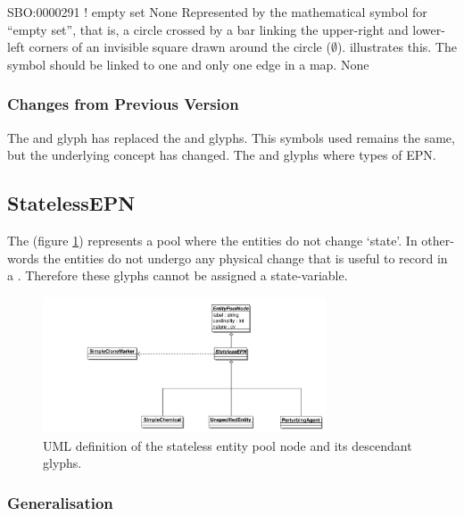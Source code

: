 \begin{glyphDescription}
\glyphSboTerm SBO:0000291 ! empty set
\glyphAux None
\glyphContainer Represented by the mathematical symbol for ``empty
set'', that is, a circle crossed by a bar linking the upper-right and
lower-left corners of an invisible square drawn around the circle ($\emptyset$).
 illustrates this.  The symbol should be linked to one
and only one edge in a map.
\glyphLabel None
\end{glyphDescription}

\subsubsection{Changes from Previous Version}

The  and  glyph has replaced the  and
 glyphs. This symbols used remains the same, but the
underlying concept has changed. The  and 
glyphs where types of EPN.

\subsection{StatelessEPN}
\label{defn:StatelessEPN}

The  (figure \ref{fig:statelessepnuml})
represents a pool where the entities do not change `state'. In
other-words the entities do not undergo any physical change that is
useful to record in a \PDm. Therefore these glyphs cannot be assigned
a state-variable.

\begin{figure}[htb]
  \centering
  \includegraphics[width=0.75\textwidth]{images/statelessepnuml}
\caption{UML definition of the stateless entity pool node and its descendant glyphs.}
  \label{fig:statelessepnuml}
\end{figure}

\subsubsection{Generalisation}

